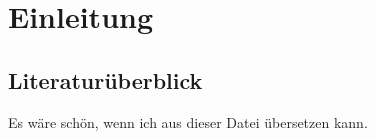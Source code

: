 \chapter{Einleitung}

\section{Literaturüberblick}

Es wäre schön, wenn ich aus dieser Datei übersetzen kann.

\blindtext[5]

\blindtext[5]

\blindtext[5]

\blindtext[5]

\blindtext[5]